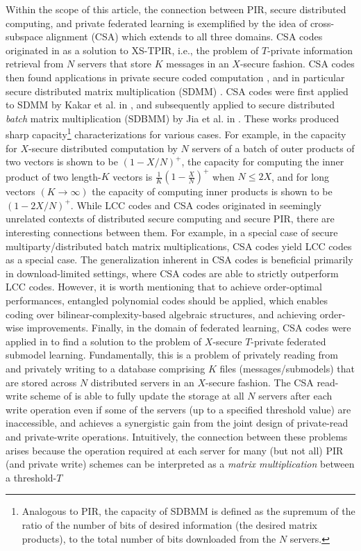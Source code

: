Within the scope of this article, the connection between PIR, secure distributed computing, and private federated learning is  exemplified by the idea of cross-subspace alignment (CSA) which extends to all three domains.  CSA codes originated in \cite{Jia_Sun_Jafar_XSTPIR} as a solution to XS-TPIR, i.e., the problem of $T$-private information retrieval from $N$ servers that store $K$ messages in an $X$-secure fashion. CSA codes then found applications in private secure coded computation \cite{Kim_Lee_PSCC, Chang_Tandon_PSDMM, Jia_Jafar_MDSXSTPIR}, and in particular secure distributed matrix multiplication (SDMM) \cite{Chang_Tandon_SDMMOS}. CSA codes were first applied to SDMM by Kakar et al. in \cite{Kakar_Ebadifar_Sezgin_CSA}, and subsequently applied to  secure distributed \emph{batch} matrix multiplication  (SDBMM) by Jia et al. in \cite{Jia_Jafar_SDBMM}. These works produced sharp capacity\footnote{Analogous to PIR, the capacity of SDBMM is defined as the supremum of the ratio of the number of bits of desired information (the desired matrix products), to the total number of bits downloaded  from the $N$ servers.} characterizations for various cases. For example, in \cite{Jia_Jafar_SDBMM} the capacity for $X$-secure distributed computation by $N$ servers of a batch of outer products of two vectors is shown to be $(1-X/N)^+$,  the capacity for computing the inner product of two  length-$K$ vectors is  $\frac{1}{K}(1-\frac{X}{N})^+$ when $N\leq 2X$, and for long vectors $(K\rightarrow\infty)$ the capacity of computing inner products is shown to be $(1-2X/N)^+$.  While LCC \cite{pmlr-v89-yu19b} codes and CSA codes originated in seemingly unrelated contexts of distributed secure computing and secure PIR, there are interesting connections between them. For example, in a special case of secure multiparty/distributed batch matrix multiplications, CSA codes yield LCC codes as a special case\cite{Jia_Jafar_CSA_MM, Chen_Jia_Wang_Jafar}. The generalization inherent in CSA codes is beneficial primarily in download-limited settings, where CSA codes are able to strictly outperform LCC codes. However, it is worth mentioning that to achieve order-optimal performances, entangled polynomial codes \cite{8437563, 9174167} should be applied, which enables coding over bilinear-complexity-based algebraic structures, and achieving order-wise improvements.  Finally, in the domain of federated learning, CSA codes were applied in \cite{Jia_Jafar_XSTPFSL} to find a solution to the problem of $X$-secure $T$-private federated submodel learning. Fundamentally, this is a problem of privately reading from and privately writing to a database comprising $K$ files (messages/submodels) that are stored across $N$ distributed servers in an $X$-secure fashion. The CSA read-write scheme of \cite{Jia_Jafar_XSTPFSL}  is able to fully update the storage at all $N$ servers after each write operation even if some of the servers (up to a specified threshold value) are inaccessible, and  achieves a synergistic gain from the joint design of private-read and private-write operations. Intuitively, the connection between these problems arises because the operation required at each server for many (but not all) PIR (and private write) schemes can be interpreted as a \emph{matrix multiplication} between a threshold-$T$ 